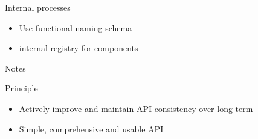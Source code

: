 \begin{frame}{Internal processes}
\protect\hypertarget{internal-processes}{}

\begin{itemize}
\tightlist
\item
  Use functional naming schema
\item
  internal registry for components
\end{itemize}

\end{frame}

\begin{frame}{Notes}
\protect\hypertarget{notes}{}

\begin{block}{Principle}

\begin{itemize}
\tightlist
\item
  Actively improve and maintain API consistency over long term
\item
  Simple, comprehensive and usable API
\end{itemize}

\end{block}

\end{frame}
